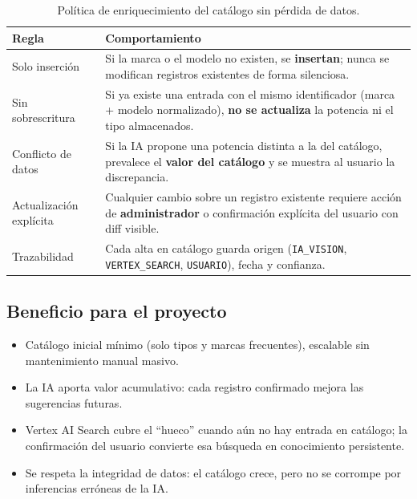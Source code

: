 \documentclass[11pt,a4paper]{article}
\renewcommand{\arraystretch}{1.25}
\begin{document}
\begin{table}[H]
\centering
\footnotesize
\renewcommand{\arraystretch}{1.2}
\caption{Política de enriquecimiento del catálogo sin pérdida de datos.}
\begin{tabularx}{\textwidth}{|L{0.22\textwidth}|Y|}
\hline
{}
\textbf{Regla} & \textbf{Comportamiento} \\ \hline
Solo inserción & Si la marca o el modelo no existen, se \textbf{insertan}; nunca se modifican registros existentes de forma silenciosa. \\ \hline
Sin sobrescritura & Si ya existe una entrada con el mismo identificador (marca + modelo normalizado), \textbf{no se actualiza} la potencia ni el tipo almacenados. \\ \hline
Conflicto de datos & Si la IA propone una potencia distinta a la del catálogo, prevalece el \textbf{valor del catálogo} y se muestra al usuario la discrepancia. \\ \hline
Actualización explícita & Cualquier cambio sobre un registro existente requiere acción de \textbf{administrador} o confirmación explícita del usuario con diff visible. \\ \hline
Trazabilidad & Cada alta en catálogo guarda origen (\texttt{IA\_VISION}, \texttt{VERTEX\_SEARCH}, \texttt{USUARIO}), fecha y confianza. \\ \hline
\end{tabularx}
\end{table}

\subsection{Beneficio para el proyecto}

\begin{itemize}[leftmargin=*]
  \item Catálogo inicial mínimo (solo tipos y marcas frecuentes), escalable sin mantenimiento manual masivo.
  \item La IA aporta valor acumulativo: cada registro confirmado mejora las sugerencias futuras.
  \item Vertex AI Search cubre el ``hueco'' cuando aún no hay entrada en catálogo; la confirmación del usuario convierte esa búsqueda en conocimiento persistente.
  \item Se respeta la integridad de datos: el catálogo crece, pero no se corrompe por inferencias erróneas de la IA.
\end{itemize}
\end{document}
